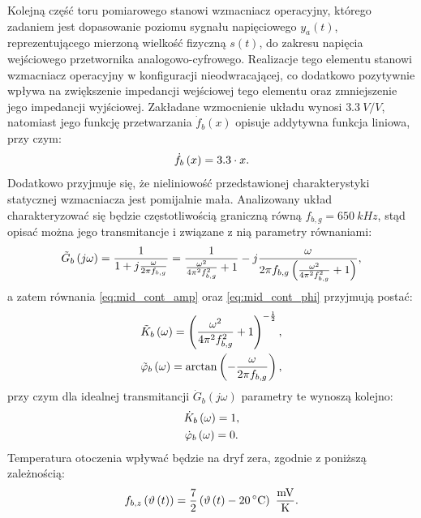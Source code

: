 Kolejną część toru pomiarowego stanowi wzmacniacz operacyjny, którego zadaniem jest dopasowanie poziomu sygnału napięciowego $y_{a}(t)$, reprezentującego mierzoną wielkość fizyczną $s(t)$, do zakresu napięcia wejściowego przetwornika analogowo-cyfrowego. Realizacje tego elementu stanowi wzmacniacz operacyjny w konfiguracji nieodwracającej, co dodatkowo pozytywnie wpływa na zwiększenie impedancji wejściowej tego elementu oraz zmniejszenie jego impedancji wyjściowej. Zakładane wzmocnienie układu wynosi $\qty{3.3}{V \per V}$, natomiast jego funkcję przetwarzania $\dot{f}_{b}(x)$ opisuje addytywna funkcja liniowa, przy czym:
\begin{equation}
\dot{f}_{b} \left(x\right) = 3.3 \cdot x \label{eq:sym_partb_function}.
\end{equation}
Dodatkowo przyjmuje się, że nieliniowość przedstawionej charakterystyki statycznej wzmacniacza jest pomijalnie mała. Analizowany układ charakteryzować się będzie częstotliwością graniczną równą $f_{b,g} = \qty{650}{kHz}$, stąd opisać można jego transmitancje i związane z nią parametry równaniami:
\begin{equation}
\tilde{G}_{b} \left(j\omega\right) = \frac{1}{1 + j \frac{\omega}{2 \pi f_{b,g}}} = \frac{1}{\frac{\omega^{2}}{4 \pi^{2} f_{b,g}^{2}} + 1} - j \frac{\omega}{2 \pi f_{b,g} \left( \frac{\omega^{2}}{4 \pi^{2} f_{b,g}^{2}} + 1 \right) } \label{eq:sym_partb_trans},
\end{equation}
a zatem równania \eqref{eq:mid_cont_amp} oraz \eqref{eq:mid_cont_phi} przyjmują postać:
\begin{gather}
\tilde{K}_{b} \left(\omega\right) = \left( \frac{\omega^{2}}{4 \pi^{2} f_{b,g}^{2}} + 1 \right)^{-\frac{1}{2}} \label{eq:sym_partb_amp_real}, \\
\tilde{\varphi}_{b} \left(\omega\right) = \arctan \left( -\frac{\omega}{2 \pi f_{b,g}} \right) \label{eq:sym_partb_phi_real},
\end{gather}
przy czym dla idealnej transmitancji $\dot{G}_{b}(j\omega)$ parametry te wynoszą kolejno:
\begin{gather}
\dot{K}_{b} \left(\omega\right) = 1 \label{eq:sym_partb_amp_ideal}, \\
\dot{\varphi}_{b} \left(\omega\right) = 0 \label{eq:sym_partb_phi_ideal}.
\end{gather}
Temperatura otoczenia wpływać będzie na dryf zera, zgodnie z poniższą zależnością:
\begin{equation}
f_{b,z} \left( \vartheta \emb{t} \right) = \frac{7}{2} \left( \vartheta \emb{t} - \qty{20}{\degreeCelsius} \right) ~\unit{\frac{mV}{K}} \label{eq:sym_partb_temp_err}.
\end{equation}

